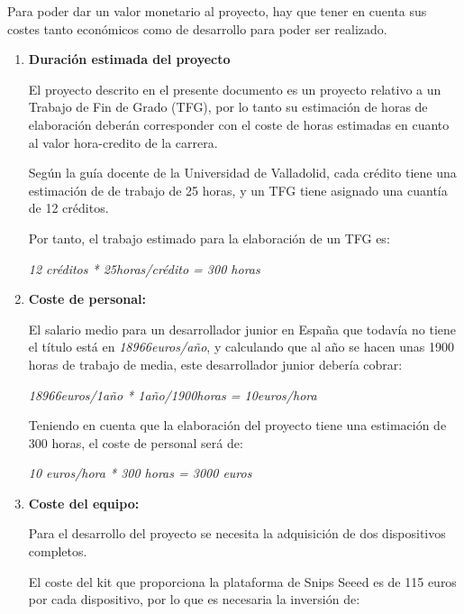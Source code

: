 Para poder dar un valor monetario al proyecto, hay que tener en cuenta sus costes tanto económicos como de desarrollo para poder ser realizado.

\begin{enumerate}
    \item \textbf{Duración estimada del proyecto} \label{duracion_proyecto}
    
El proyecto descrito en el presente documento es un proyecto relativo a un Trabajo de Fin de Grado (TFG), por lo tanto su estimación de horas de elaboración deberán corresponder con el coste de horas estimadas en cuanto al valor hora-credito de la carrera.

Según la guía docente de la Universidad de Valladolid, cada crédito tiene una estimación de de trabajo de 25 horas, y un TFG tiene asignado una cuantía de 12 créditos.

Por tanto, el trabajo estimado para la elaboración de un TFG es:

\begin{center}
    \textit{12 créditos * 25horas/crédito = 300 horas}
\end{center}

    \item\textbf{ Coste de personal:}
    
El salario medio para un desarrollador junior en España que todavía no tiene el título está en \textit{18966euros/año}, y calculando que al año se hacen unas 1900 horas de trabajo de media, este desarrollador junior debería cobrar:

\begin{center}
    \textit{18966euros/1año * 1año/1900horas = 10euros/hora}
\end{center}

Teniendo en cuenta que la elaboración del proyecto tiene una estimación de 300 horas, el coste de personal será de:

\begin{center}
    \textit{10 euros/hora * 300 horas = 3000 euros}
\end{center}

    \item \textbf{ Coste del equipo: }
    
Para el desarrollo del proyecto se necesita la adquisición de dos dispositivos completos.

El coste del kit que proporciona la plataforma de Snips Seeed es de 115 euros por cada dispositivo, por lo que es necesaria la inversión de:


\end{enumerate}
